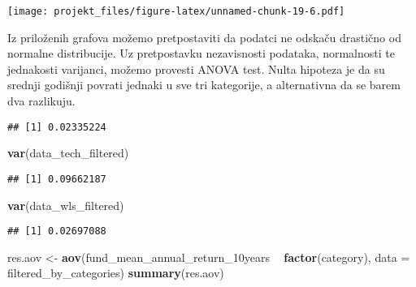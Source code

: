 \documentclass[
]{article}
\newenvironment{Shaded}{\begin{snugshade}}{\end{snugshade}}
\newcommand{\DataTypeTok}[1]{\textcolor[rgb]{0.13,0.29,0.53}{#1}}
\newcommand{\KeywordTok}[1]{\textcolor[rgb]{0.13,0.29,0.53}{\textbf{#1}}}
\newcommand{\NormalTok}[1]{#1}
\newcommand{\OperatorTok}[1]{\textcolor[rgb]{0.81,0.36,0.00}{\textbf{#1}}}
\newcommand{\StringTok}[1]{\textcolor[rgb]{0.31,0.60,0.02}{#1}}
\begin{document}
\texttt{[image: projekt\_files/figure-latex/unnamed-chunk-19-6.pdf]}

Iz priloženih grafova možemo pretpostaviti da podatci ne odskaču
drastično od normalne distribucije. Uz pretpostavku nezavisnosti
podataka, normalnosti te jednakosti varijanci, možemo provesti ANOVA
test. Nulta hipoteza je da su srednji godišnji povrati jednaki u sve tri
kategorije, a alternativna da se barem dva razlikuju.

\begin{Shaded}
\end{Shaded}

\begin{verbatim}
## [1] 0.02335224
\end{verbatim}

\begin{Shaded}
\begin{Highlighting}[]
\KeywordTok{var}\NormalTok{(data_tech_filtered)}
\end{Highlighting}
\end{Shaded}

\begin{verbatim}
## [1] 0.09662187
\end{verbatim}

\begin{Shaded}
\begin{Highlighting}[]
\KeywordTok{var}\NormalTok{(data_wls_filtered)}
\end{Highlighting}
\end{Shaded}

\begin{verbatim}
## [1] 0.02697088
\end{verbatim}

\begin{Shaded}
\begin{Highlighting}[]
\NormalTok{res.aov <-}\StringTok{ }\KeywordTok{aov}\NormalTok{(fund_mean_annual_return_10years }\OperatorTok{~}\StringTok{ }\KeywordTok{factor}\NormalTok{(category), }\DataTypeTok{data =}\NormalTok{ filtered_by_categories)}
\KeywordTok{summary}\NormalTok{(res.aov)}
\end{Highlighting}
\end{Shaded}
\end{document}
